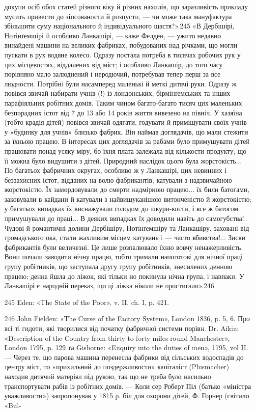 докупи осіб обох статей різного віку й різних нахилів, що заразливість прикладу мусить привести до
зіпсованости й розпусти, — чи може така мануфактура збільшити суму національного й індивідуального
щастя?».245 «В Дербішірі, Нотінґемшірі й особливо
Ланкашірі, — каже Фелден, — ужито недавно винайдені машини на великих фабриках, побудованих над
річками, що могли пускати в рух водяне колесо. Одразу постала потреба в тисячах робочих рук у цих
місцевостях, віддалених від міст; і особливо
Ланкашір, до того часу порівняно мало залюднений і неродючий, потребував тепер перш за все людности.
Потрібні були насамперед маленькі й меткі дитячі руки. Одразу ж повівся звичай набирати учнів (!) із
лондонських, бірмінґемських та інших парафіяльних робітних домів. Таким чином багато-багато тисяч
цих маленьких безпорадних істот від 7 до 13 або 14 років життя вивезено на північ. У хазяїна (тобто
крадія дітей) повівся звичай одягати, годувати й приміщувати своїх учнів у «будинку для учнів»
близько фабрик. Він наймав доглядачів, що мали стежити за їхньою працею. В інтересах цих доглядачів
за рабами було примушувати дітей працювати понад усяку міру, бо їхня плата залежала від кількости
продукту, що її можна було видушити
з дітей. Природний наслідок цього була жорстокість... По багатьох фабричних округах, особливо ж у
Ланкашірі, цих невинних і беззахисних істот, відданих на волю фабрикантів, катували з надзвичайною
жорстокістю. Їх замордовували до смерти надмірною працею... їх били батогами, заковували в кайдани й
катували з найвишуканішою витонченістю й жорстокістю; у багатьох випадках їх виснажували голодом до
шкури-кости, і все ж батогом примушували до праці... В деяких випадках їх доводили навіть до
самогубства!.. Чудові й романтичні долини Дербішіру, Нотінґемшіру та Ланкашіру, заховані від
громадського ока, стали жахливим місцем катувань і — часто вбивства!... Зиски фабрикантів були
величезні. Це лише розпалювало їхню вовчу ненажерливість. Вони почали заводити нічну працю, тобто
тримали напоготові для нічної праці групу робітників, що заступала другу групу робітників,
знесилених денною працею; денна йшла до ліжок, які тільки но покинула нічна група, і навпаки. У
Ланкашірі є народній переказ, що ці ліжка ніколи не простигали».246

245    Eden: «The State of the Poor», v. II, ch. I, p. 421.

246 John Fielden: «The Curse of the Factory System», London 1836, p. 5, 6. Про всі ті гидоти, які
творилися від початку фабричної системи порівн. Dr. Aikin: «Description of the Country from thirty
to forty miles round Manchester», London 1795, p. 129 та Gisborne: «Enquiry into the duties of men»,
1795, vol II. — Через те, що парова машина перенесла
фабрики від сільських водоспадів до центру міст, то «прихильний до поздержливости» капіталіст
(Plusmacher) находив дитячий матеріял під рукою, так що не треба було насильно транспортувати рабів
із робітних домів. — Коли сер Роберт Піл (батько «міністра уважливости») запропонував у 1815 р. біл
для охорони дітей, Ф. Горнер (світило «Bul-
